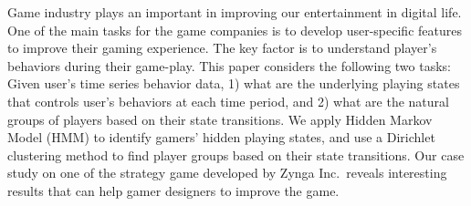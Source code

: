 Game industry plays an important in improving our entertainment in digital life. 
One of the main tasks for the game companies is to develop user-specific features to 
improve their gaming experience. The key factor is to understand player's behaviors during their 
game-play. This paper  considers the following two tasks: 
Given user's time series behavior data, 1) what are the underlying playing states that 
controls user's behaviors at each time period, and 2) what are the natural groups of players based 
on their state transitions. We apply Hidden Markov Model (HMM) to identify gamers' 
hidden playing states, and use a Dirichlet clustering method to find player groups based on 
their state transitions. Our case study on one of the strategy game developed by Zynga Inc.\  
reveals interesting results that can help gamer designers to improve the game.

